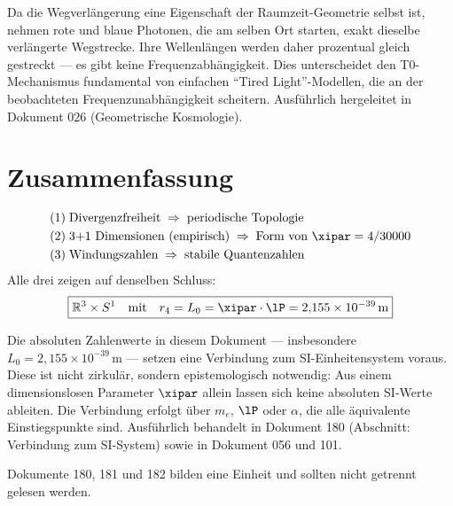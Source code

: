 \begin{keypoint}
Da die Wegverlängerung eine Eigenschaft der Raumzeit-Geometrie selbst ist, nehmen rote und blaue Photonen, die am selben Ort starten, exakt dieselbe verlängerte Wegstrecke. Ihre Wellenlängen werden daher prozentual gleich gestreckt — es gibt keine Frequenzabhängigkeit. Dies unterscheidet den T0-Mechanismus fundamental von einfachen ``Tired Light''-Modellen, die an der beobachteten Frequenzunabhängigkeit scheitern. Ausführlich hergeleitet in Dokument 026 (Geometrische Kosmologie).
\end{keypoint}

\section{Zusammenfassung}

\begin{keyresult}
\begin{align}
	(1)\; & \text{Divergenzfreiheit} \;\Rightarrow\; \text{periodische Topologie} \notag \\
	(2)\; & \text{3+1 Dimensionen (empirisch)} \;\Rightarrow\; \text{Form von } \xipar = 4/30000 \notag \\
	(3)\; & \text{Windungszahlen} \;\Rightarrow\; \text{stabile Quantenzahlen} \notag
\end{align}
Alle drei zeigen auf denselben Schluss:
\begin{equation}
	\boxed{\mathbb{R}^3 \times S^1 \quad \text{mit} \quad r_4 = L_0 = \xipar \cdot \lP = 2{,}155 \times 10^{-39}\,\text{m}}
\end{equation}
\end{keyresult}


\begin{foundation}
Die absoluten Zahlenwerte in diesem Dokument — insbesondere $L_0 = 2{,}155 \times 10^{-39}\,\text{m}$ — setzen eine Verbindung zum SI-Einheitensystem voraus. Diese ist nicht zirkulär, sondern epistemologisch notwendig: Aus einem dimensionslosen Parameter $\xipar$ allein lassen sich keine absoluten SI-Werte ableiten. Die Verbindung erfolgt über $m_e$, $\lP$ oder $\alpha$, die alle äquivalente Einstiegspunkte sind. Ausführlich behandelt in Dokument 180 (Abschnitt: Verbindung zum SI-System) sowie in Dokument 056 und 101.

Dokumente 180, 181 und 182 bilden eine Einheit und sollten nicht getrennt gelesen werden.
\end{foundation}


